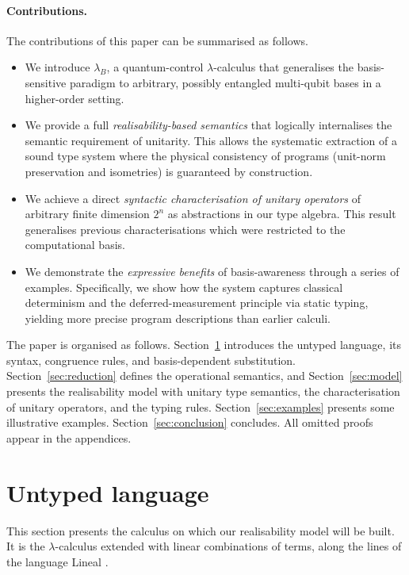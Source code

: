 \documentclass[a4paper,UKenglish,numberwithinsect,pdfa,anonymous]{lipics-v2021}
\theoremstyle{restatestyle}
\newcommand{\lambdaB}{\lambda_B}
\begin{document}
\paragraph*{Contributions.}
The contributions of this paper can be summarised as follows.
\begin{itemize}[nosep]
  \item We introduce $\lambdaB$, a quantum-control $\lambda$-calculus that 
  generalises the basis-sensitive paradigm to arbitrary, possibly entangled 
  multi-qubit bases in a higher-order setting.
  \item We provide a full \emph{realisability-based semantics} that 
  logically internalises the semantic requirement of unitarity. This allows 
  the systematic extraction of a sound type system where the physical consistency 
  of programs (unit-norm preservation and isometries) is guaranteed by 
  construction.
  \item We achieve a direct \emph{syntactic characterisation of unitary operators} 
  of arbitrary finite dimension $2^n$ as abstractions in our type algebra. 
  This result generalises previous characterisations which were restricted 
  to the computational basis.
  \item We demonstrate the \emph{expressive benefits} of basis-awareness 
  through a series of examples. Specifically, we show how the system captures 
  classical determinism and the deferred-measurement principle via static 
  typing, yielding more precise program descriptions than earlier calculi.
\end{itemize}

The paper is organised as follows.  
Section~\ref{sec:calculus} introduces the untyped language, its syntax, congruence rules,
and basis-dependent substitution.  
Section~\ref{sec:reduction} defines the operational semantics, and
Section~\ref{sec:model} presents the realisability model with unitary type semantics,
the characterisation of unitary operators, and the typing rules.  
Section~\ref{sec:examples} presents some illustrative examples.
Section~\ref{sec:conclusion} concludes.
All omitted proofs appear in the appendices.

\section{Untyped language}\label{sec:calculus}
This section presents the calculus on which our realisability model will be
built. It is the $\lambda$-calculus extended with linear combinations of terms, 
along the lines of the language Lineal \cite{ArrighiDowekLMCS17}.
\end{document}
